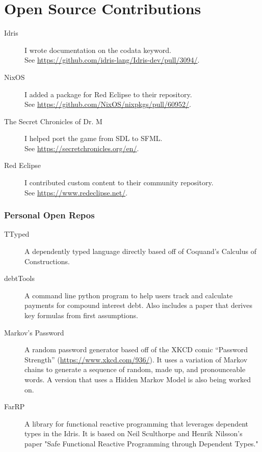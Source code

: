 \documentclass{article}
\newcommand{\osscontrib}[3]{\item[#1] #2\hfill\\See #3.}
\begin{document}
\section*{Open Source Contributions}

\begin{description}
    \osscontrib{Idris}{I wrote documentation on the codata keyword.}{\url{https://github.com/idris-lang/Idris-dev/pull/3094/}}

    \osscontrib{NixOS}{I added a package for Red Eclipse to their
    repository.}{\url{https://github.com/NixOS/nixpkgs/pull/60952/}}

    \osscontrib{The Secret Chronicles of Dr. M}{I helped port the game
    from SDL to SFML.}{\url{https://secretchronicles.org/en/}}

    \osscontrib{Red Eclipse}{I contributed custom content to their community
    repository.}{\url{https://www.redeclipse.net/}}
\end{description}

\subsubsection*{Personal Open Repos}

\begin{description}
    \item[TTyped] A dependently typed language directly based off of
        Coquand's Calculus of Constructions.

    \item[debtTools] A command line python program to help users track
        and calculate payments for compound interest debt.
        Also includes a paper that derives key formulas from first
        assumptions.

    \item[Markov's Password] A random password generator based off of
        the XKCD comic ``Password Strength''
        (\url{https://www.xkcd.com/936/}).
        It uses a variation of Markov chains to generate a sequence of
        random, made up, and pronounceable words.
        A version that uses a Hidden Markov Model is also being worked
        on.

    \item[FarRP] A library for functional reactive programming that
        leverages dependent types in the Idris.
        It is based on Neil Sculthorpe and Henrik Nilsson's paper "Safe
        Functional Reactive Programming through Dependent Types."
\end{description}
\end{document}
